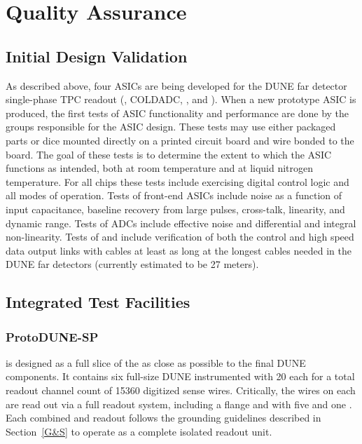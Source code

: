\section{Quality Assurance}
\label{sec:fdsp-tpcelec-qa}

\subsection{Initial Design Validation}
\label{sec:fdsp-tpcelec-qa-initial}

As described above, four ASICs are being developed for the DUNE far detector single-phase TPC readout (, COLDADC, , and ).  When a new prototype ASIC is produced, the first tests of ASIC functionality and performance are done by the groups responsible for the ASIC design.  These tests may use either packaged parts or dice mounted directly on a printed circuit board and wire bonded to the board.  The goal of these tests is to determine the extent to which the ASIC functions as intended, both at room temperature and at liquid nitrogen temperature.  For all chips these tests include exercising digital control logic and all modes of operation.  Tests of front-end ASICs include noise as a function of input capacitance, baseline recovery from large pulses, cross-talk, linearity, and dynamic range.  Tests of ADCs include effective noise and differential and integral non-linearity.  Tests of  and  include verification of both the control and high speed data output links with cables at least as long at the longest cables needed in the DUNE far detectors (currently estimated to be 27 meters).

\subsection{Integrated Test Facilities}
\label{sec:fdsp-tpcelec-qa-facilities}

\subsubsection{ProtoDUNE-SP}
\label{sec:fdsp-tpcelec-qa-facilities-pdune}

 is designed as a full slice of the  as close as possible to the final 
DUNE \single components. It contains six full-size DUNE  instrumented with \num{20} 
 each for a total readout channel count of \num{15360} digitized sense wires. Critically, 
the wires on each  are read out via a full  readout system, including a  
flange and  with five  and one . Each combined  and 
readout follows the grounding guidelines described in Section~\ref{G&S} to operate as a complete isolated
readout unit.

